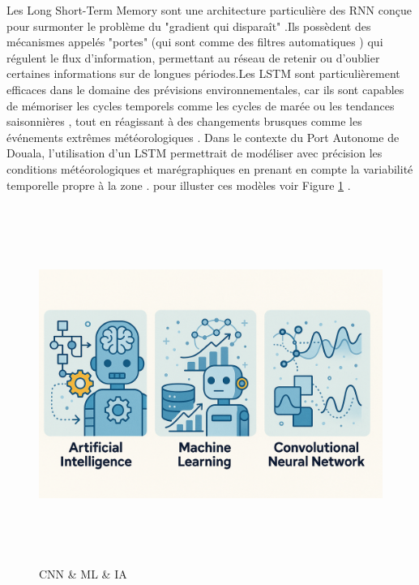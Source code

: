 \documentclass[a4paper,12pt,openany]{report}
\begin{document}
	\quad Les Long Short-Term Memory sont une architecture particulière des RNN conçue pour surmonter le problème du "gradient qui disparaît" \cite{Hochreiter1997}.Ils possèdent des mécanismes appelés "portes" (qui sont comme des filtres automatiques ) qui régulent le flux d’information, permettant au réseau de retenir ou d’oublier certaines informations sur de longues périodes.Les LSTM sont particulièrement efficaces dans le domaine des prévisions environnementales, car ils sont capables de mémoriser les cycles temporels comme les cycles de marée ou les tendances saisonnières , tout en réagissant à des changements brusques comme les événements extrêmes météorologiques \cite{Bianchi2017}.
	Dans le contexte du Port Autonome de Douala, l’utilisation d’un LSTM permettrait de modéliser avec précision les conditions météorologiques et marégraphiques en prenant en compte la variabilité temporelle propre à la zone \cite{Wang2021}.
	pour illuster ces modèles  voir Figure \ref{Fig 1.8} .
		\begin{figure}[H]
		\begin{center}
			\begin{minipage}{\textwidth}
				\begin{center}
					\includegraphics[width=1\textwidth,height=4.6in]{images/an abstract represen.png}
				\end{center}
			\end{minipage}
			
			\caption{CNN \& ML \& IA \cite{Abraham2019}\label{Fig 1.8}}
		\end{center}
	\end{figure}%
	
\end{document}
